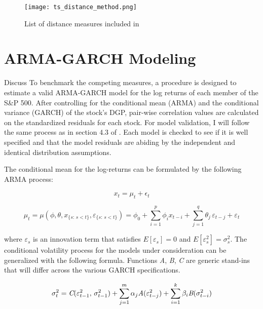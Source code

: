 \documentclass[12pt]{article}
\begin{document}
\begin{figure}[!ht]
    \centering
    \texttt{[image: ts\_distance\_method.png]}
    \caption{List of distance measures included in \cite{ElsingAgon2012}}
    \label{fig:ds_dist_meas_table}
\end{figure}


\pagebreak

\appendix 

\section{ARMA-GARCH Modeling} \label{sec:ARMAGARCH-benchmark}

Discuss 
To benchmark the competing measures, a procedure is designed to estimate a valid ARMA-GARCH model for the log returns of each member of the S\&P 500. After controlling for the conditional mean (ARMA) and the conditional variance (GARCH) of the stock's DGP, pair-wise correlation values are calculated on the standardized residuals for each stock. For model validation, I will follow the same process as in section 4.3 of \cite{DowiakTV-COP}. Each model is checked to see if it is well specified and that the model residuals are abiding by the independent and identical distribution assumptions.

The conditional mean for the log-returns can be formulated by the following ARMA process:

\begin{equation} \label{eqn:marginalModel}
    x_{t} = \mu_{t} + \epsilon_{t}
\end{equation}

\begin{equation} \label{eq:conditional_mean}
    \mu_{t} = \mu(\phi, \theta, x_{\{s:\, s < t\}}, \varepsilon_{\{s:\, s < t\}}) = \phi_{0} + \sum_{i=1}^{p} \phi_{i} x_{t-i} + \sum_{j=1}^{q} \theta_{j} \, \varepsilon_{t - j} + \varepsilon_{t}
\end{equation}

where $\varepsilon_{s}$ is an innovation term that satisfies $E[\varepsilon_{s}] = 0$ and $E[\varepsilon^{2}_{s}] = \sigma^{2}_{s}$. The conditional volatility process for the models under consideration can be generalized with the following formula. Functions \emph{A}, \emph{B}, \emph{C} are generic stand-ins that will differ across the various GARCH specifications.

\begin{equation} \label{eq:conditional_var}
    \sigma^{2}_{t} = \emph{C}(\varepsilon^{2}_{t-1}, \, \sigma^{2}_{t-1}) + \sum_{j=1}^{m} \alpha_{j} \emph{A}(\varepsilon^{2}_{t - j}) + \sum_{i=1}^{k} \beta_{i} \emph{B}(\sigma^{2}_{t - i})
\end{equation}
\end{document}
